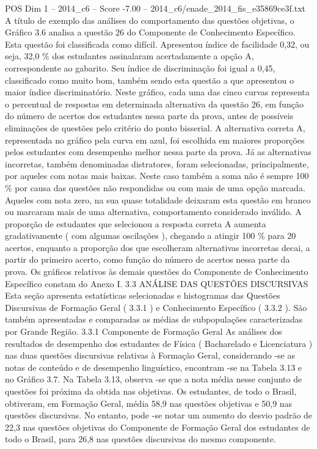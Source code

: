 \begin{textsample}{POS Dim 1 – 2014\_c6 – Score -7.00 – 2014\_c6/enade\_2014\_fis\_e35869ce3f.txt}
A título de exemplo das análises do comportamento das questões objetivas, o Gráfico 3.6 analisa a questão 26 do Componente de Conhecimento Específico.
Esta questão foi classificada como difícil.
Apresentou índice de facilidade 0,32, ou seja, 32,0 \% dos estudantes assinalaram acertadamente a opção A, correspondente ao gabarito.
Seu índice de discriminação foi igual a 0,45, classificado como muito bom, também sendo esta questão a que apresentou o maior índice discriminatório.
Neste gráfico, cada uma das cinco curvas representa o percentual de respostas em determinada alternativa da questão 26, em função do número de acertos dos estudantes nessa parte da prova, antes de possíveis eliminações de questões pelo critério do ponto bisserial.
A alternativa correta A, representada no gráfico pela curva em azul, foi escolhida em maiores proporções pelos estudantes com desempenho melhor nessa parte da prova.
Já as alternativas incorretas, também denominadas distratores, foram selecionadas, principalmente, por aqueles com notas mais baixas.
Neste caso também a soma não é sempre 100 \% por causa das questões não respondidas ou com mais de uma opção marcada.
Aqueles com nota zero, na sua quase totalidade deixaram esta questão em branco ou marcaram mais de uma alternativa, comportamento considerado inválido.
A proporção de estudantes que selecionou a resposta correta A aumenta gradativamente ( com algumas oscilações ), chegando a atingir 100 \% para 20 acertos, enquanto a proporção dos que escolheram alternativas incorretas decai, a partir do primeiro acerto, como função do número de acertos nessa parte da prova.
Os gráficos relativos às demais questões do Componente de Conhecimento Específico constam do Anexo I. 3.3 ANÁLISE DAS QUESTÕES DISCURSIVAS Esta seção apresenta estatísticas selecionadas e histogramas das Questões Discursivas de Formação Geral ( 3.3.1 ) e Conhecimento Específico ( 3.3.2 ).
São também apresentadas e comparadas as médias de subpopulações caracterizadas por Grande Região. 3.3.1 Componente de Formação Geral As análises dos resultados de desempenho dos estudantes de Física ( Bacharelado e Licenciatura ) nas duas questões discursivas relativas à Formação Geral, considerando -se as notas de conteúdo e de desempenho linguístico, encontram -se na Tabela 3.13 e no Gráfico 3.7.
Na Tabela 3.13, observa -se que a nota média nesse conjunto de questões foi próxima da obtida nas objetivas.
Os estudantes, de todo o Brasil, obtiveram, em Formação Geral, média 58,9 nas questões objetivas e 50,9 nas questões discursivas.
No entanto, pode -se notar um aumento do desvio padrão de 22,3 nas questões objetivas do Componente de Formação Geral dos estudantes de todo o Brasil, para 26,8 nas questões discursivas do mesmo componente.

\end{textsample}
